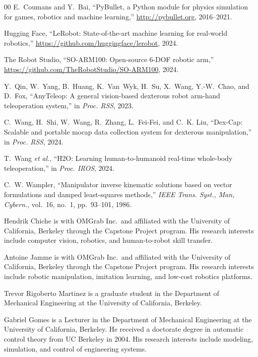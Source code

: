 \documentclass{ieeeaccess}
\begin{document}
\begin{thebibliography}{00}
E.~Coumans and Y.~Bai,
``PyBullet, a Python module for physics simulation for games, robotics
and machine learning,''
\url{http://pybullet.org}, 2016--2021.

Hugging Face,
``LeRobot: State-of-the-art machine learning for real-world robotics,''
\url{https://github.com/huggingface/lerobot}, 2024.

The Robot Studio,
``SO-ARM100: Open-source 6-DOF robotic arm,''
\url{https://github.com/TheRobotStudio/SO-ARM100}, 2024.

Y.~Qin, W.~Yang, B.~Huang, K.~Van~Wyk, H.~Su, X.~Wang,
Y.-W.~Chao, and D.~Fox,
``AnyTeleop: A general vision-based dexterous robot arm-hand
teleoperation system,'' in \emph{Proc. RSS}, 2023.

C.~Wang, H.~Shi, W.~Wang, R.~Zhang, L.~Fei-Fei, and C.~K. Liu,
``Dex-Cap: Scalable and portable mocap data collection system for
dexterous manipulation,'' in \emph{Proc. RSS}, 2024.

T.~Wang \emph{et al.},
``H2O: Learning human-to-humanoid real-time whole-body teleoperation,''
in \emph{Proc. IROS}, 2024.

C.~W. Wampler,
``Manipulator inverse kinematic solutions based on vector formulations
and damped least-squares methods,''
\emph{IEEE Trans. Syst., Man, Cybern.}, vol.~16, no.~1, pp.~93--101,
1986.

\end{thebibliography}

\begin{IEEEbiographynophoto}{Hendrik Chiche}
is with OMGrab Inc.\ and affiliated with the University of California,
Berkeley through the Capstone Project program.
His research interests include computer vision, robotics, and
human-to-robot skill transfer.
\end{IEEEbiographynophoto}

\begin{IEEEbiographynophoto}{Antoine Jamme}
is with OMGrab Inc.\ and affiliated with the University of California,
Berkeley through the Capstone Project program.
His research interests include robotic manipulation, imitation
learning, and low-cost robotics platforms.
\end{IEEEbiographynophoto}

\begin{IEEEbiographynophoto}{Trevor Rigoberto Martinez}
is a graduate student in the Department of Mechanical Engineering at the University of California, Berkeley.
\end{IEEEbiographynophoto}

\begin{IEEEbiographynophoto}{Gabriel Gomes}
is a Lecturer in the Department of Mechanical Engineering at the
University of California, Berkeley. He received a doctorate degree in
automatic control theory from UC Berkeley in 2004. His research
interests include modeling, simulation, and control of engineering
systems.
\end{IEEEbiographynophoto}

\EOD
\end{document}

